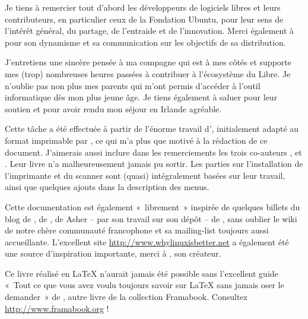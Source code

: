 \begin{Remerciements}
Je tiens à remercier tout d'abord les développeurs de logiciels libres et leurs contributeurs, en particulier ceux de la Fondation Ubuntu, pour leur sens de l'intérêt général, du partage, de l'entraide et de l'innovation. Merci également à  pour son dynamisme et sa communication sur les objectifs de sa distribution.\par
J'entretiens une sincère pensée à ma compagne qui est à mes côtés et supporte mes (trop) nombreuses heures passées à contribuer à l'écosystème du Libre. Je n'oublie pas non plus mes parents qui m'ont permis d'accéder à l'outil informatique dès mon plus jeune âge. Je tiens également à saluer  pour leur soutien et pour avoir rendu mon séjour en Irlande agréable.\par
Cette tâche a été effectuée à partir de l'énorme travail d', initialement adapté au format imprimable par , ce qui m'a plus que motivé à la rédaction de ce document. J'aimerais aussi inclure dans les remerciements les trois co-auteurs ,  et . Leur livre n'a malheureusement jamais pu sortir. Les parties sur l'installation de l'imprimante et du scanner sont (quasi) intégralement basées sur leur travail, ainsi que quelques ajouts dans la description des menus.\par
Cette documentation est également «~librement~» inspirée de quelques billets du blog de , de , de Asher -- par son travail sur son dépôt -- de  , sans oublier le wiki de notre chère communauté francophone et sa mailing-list toujours aussi accueillante. L'excellent site \url{http://www.whylinuxisbetter.net} a également été une source d'inspiration importante, merci à  , son créateur.\par
Ce livre réalisé en \LaTeX{} n'aurait jamais été possible sans l'excellent guide «~Tout ce que vous avez voulu toujours savoir sur \LaTeX{} sans jamais oser le demander~» de , autre livre de la collection Framabook. Consultez \url{http://www.framabook.org} !\par

\end{Remerciements}

